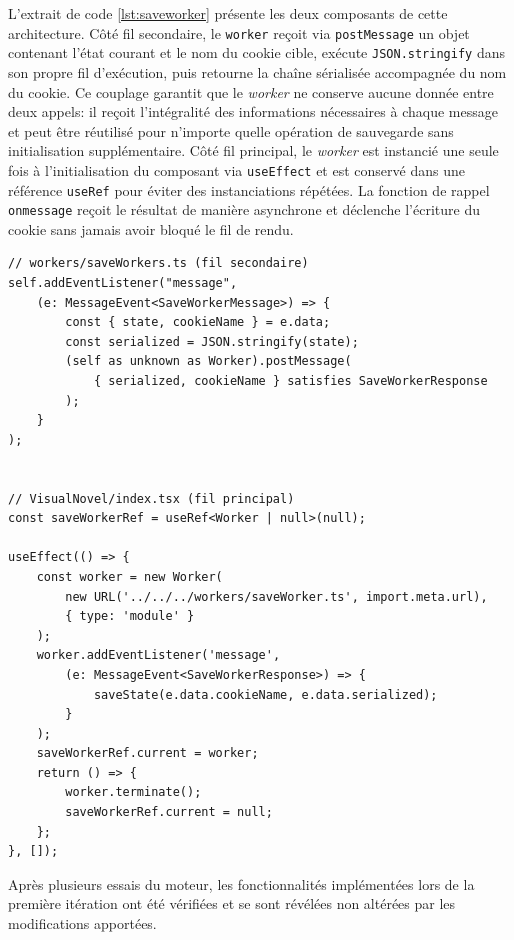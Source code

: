 L'extrait de code \ref{lst:saveworker} présente les deux composants de cette architecture. Côté fil secondaire, le \texttt{worker} reçoit via \texttt{postMessage} un objet contenant l'état courant et le nom du cookie cible, exécute \texttt{JSON.stringify} dans son propre fil d'exécution, puis retourne la chaîne sérialisée accompagnée du nom du cookie. Ce couplage garantit que le \textit{worker} ne conserve aucune donnée entre deux appels: il reçoit l'intégralité des informations nécessaires à chaque message et peut être réutilisé pour n'importe quelle opération de sauvegarde sans initialisation supplémentaire. Côté fil principal, le \textit{worker} est instancié une seule fois à l'initialisation du composant via \texttt{useEffect} et est conservé dans une référence \texttt{useRef} pour éviter des instanciations répétées. La fonction de rappel \texttt{onmessage} reçoit le résultat de manière asynchrone et déclenche l'écriture du cookie sans jamais avoir bloqué le fil de rendu.

\begin{listing}[H]
\begin{verbatim}
// workers/saveWorkers.ts (fil secondaire)
self.addEventListener("message",
    (e: MessageEvent<SaveWorkerMessage>) => {
        const { state, cookieName } = e.data;
        const serialized = JSON.stringify(state);
        (self as unknown as Worker).postMessage(
            { serialized, cookieName } satisfies SaveWorkerResponse
        );
    }
);


// VisualNovel/index.tsx (fil principal)
const saveWorkerRef = useRef<Worker | null>(null);

useEffect(() => {
    const worker = new Worker(
        new URL('../../../workers/saveWorker.ts', import.meta.url),
        { type: 'module' }
    );
    worker.addEventListener('message',
        (e: MessageEvent<SaveWorkerResponse>) => {
            saveState(e.data.cookieName, e.data.serialized);
        }
    );
    saveWorkerRef.current = worker;
    return () => {
        worker.terminate();
        saveWorkerRef.current = null;
    };
}, []);
\end{verbatim}
\caption{Implémentation du \texttt{saveWorker}: protocole de communication entre le fil principal et le fil secondaire (Auteur 2026)}
\label{lst:saveworker}
\end{listing}



Après plusieurs essais du moteur, les fonctionnalités implémentées lors de la première itération ont été vérifiées et se sont révélées non altérées par les modifications apportées.

